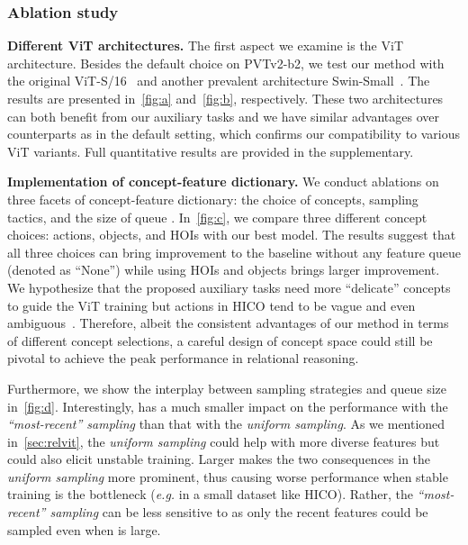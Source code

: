 \documentclass{article} \usepackage{iclr2022_conference,times}
\renewcommand{\paragraph}[1]{\noindent\textbf{#1.}}
\begin{document}
\vspace{-8pt}
\subsubsection{Ablation study}
\label{sec:exp_abl_rcl}
\vspace{-3pt}

\paragraph{Different ViT architectures}
The first aspect we examine is the ViT architecture. Besides the default choice on PVTv2-b2, we test our method with the original ViT-S/16~\citep{vit} and another prevalent architecture Swin-Small~\citep{liu2021swin}. The results are presented in~\autoref{fig:a} and~\autoref{fig:b}, respectively. These two architectures can both benefit from our auxiliary tasks and we have similar advantages over counterparts as in the default setting, which confirms our compatibility to various ViT variants. Full quantitative results are provided in the supplementary.

\paragraph{Implementation of concept-feature dictionary}
We conduct ablations on three facets of concept-feature dictionary: the choice of concepts, sampling tactics, and the size of queue . In~\autoref{fig:c}, we compare three different concept choices: actions, objects, and HOIs with our best model. The results suggest that all three choices can bring improvement to the baseline without any feature queue (denoted as ``None'') while using HOIs and objects brings larger improvement. We hypothesize that the proposed auxiliary tasks need more ``delicate'' concepts to guide the ViT training but actions in HICO tend to be vague and even ambiguous~\citep{zeroshothoi}. Therefore, albeit the consistent advantages of our method in terms of different concept selections, a careful design of concept space could still be pivotal to achieve the peak performance in relational reasoning. 

Furthermore, we show the interplay between sampling strategies and queue size  in~\autoref{fig:d}. Interestingly,  has a much smaller impact on the performance with the \textit{``most-recent'' sampling} than that with the \textit{uniform sampling}. As we mentioned in~\autoref{sec:relvit}, the \textit{uniform sampling} could help with more diverse features but could also elicit unstable training. Larger  makes the two consequences in the \textit{uniform sampling} more prominent, thus causing worse performance when stable training is the bottleneck (\emph{e.g.} in a small dataset like HICO). Rather, the \textit{``most-recent'' sampling} can be less sensitive to  as only the recent features could be sampled even when  is large.
\end{document}
